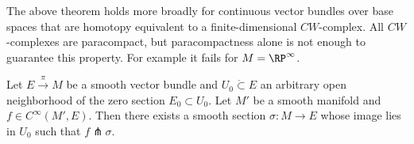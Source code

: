 \begin{rem}
    The above theorem holds more broadly for continuous vector bundles over base spaces that are homotopy equivalent to a finite-dimensional $CW$-complex. All $CW$-complexes are paracompact, but paracompactness alone is not enough to guarantee this property. For example it fails for $M=\RP^\infty$.
\end{rem}

\begin{thm}\label{transverse section thm}
Let $E\overset{\pi}{\to}M$ be a smooth vector bundle and $U_0\mathring{\subset}E$ an arbitrary open neighborhood of the zero section $E_0\subset U_0$. Let $M'$ be a smooth manifold and $f\in C^\infty(M',E)$. Then there exists a smooth section $\sigma:M\to E$ whose image lies in $U_0$ such that $f\pitchfork \sigma$.
\end{thm}
